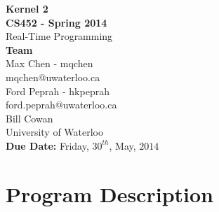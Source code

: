 \documentclass[12pt]{article}
\begin{document}
\thispagestyle{empty}
\begin{center}
  {\bf\Large Kernel 2}\\
  {\bf\large CS452 - Spring 2014}\\
  Real-Time Programming\vspace{5cm}\\
  {\bf Team }\\
  Max Chen - mqchen\\
  mqchen@uwaterloo.ca\\[1\baselineskip]
  Ford Peprah - hkpeprah\\
  ford.peprah@uwaterloo.ca\vspace{5cm}\\
  Bill Cowan\\
  University of Waterloo\\
  {\bf Due Date:} Friday, $30^{th}$, May, $2014$
\end{center}
\newpage
\thispagestyle{empty}
\tableofcontents
\newpage
\section{Program Description}
\end{document}

